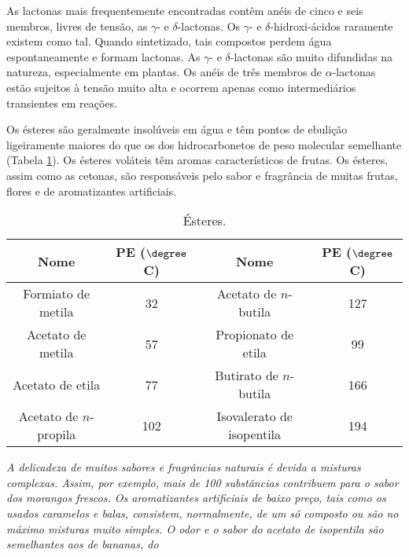 \noindent As lactonas mais frequentemente encontradas contêm anéis de cinco e seis membros, livres de tensão, as $\gamma$- e $\delta$-lactonas. Os $\gamma$- e $\delta$-hidroxi-ácidos raramente existem como tal. Quando sintetizado, tais compostos perdem água espontaneamente e formam lactonas. As $\gamma$- e $\delta$-lactonas são muito difundidas na natureza, especialmente em plantas. Os anéis de três membros de $\alpha$-lactonas estão sujeitos à tensão muito alta e ocorrem apenas como intermediários transientes em reações.

\begin{tightcenter}
    \chemnameinit{}
    \qquad\qquad
    \qquad\qquad
\end{tightcenter}

Os ésteres são geralmente insolúveis em água e têm pontos de ebulição ligeiramente maiores do que os dos hidrocarbonetos de peso molecular semelhante (Tabela \ref{tab8_3}). Os ésteres voláteis têm aromas característicos de frutas. Os ésteres, assim como as cetonas, são responsáveis pelo sabor e fragrância de muitas frutas, flores e de aromatizantes artificiais.

\begin{table}[H]
    \centering
    \caption{Ésteres.}
    \label{tab8_3}
    \begin{tabular}{cccc}
        \toprule
        Nome & PE ($\degree$C) & Nome & PE ($\degree$C)  \\
        \midrule
        Formiato de metila & 32 & Acetato de $n$-butila & 127 \\
        Acetato de metila & 57 & Propionato de etila & 99 \\
        Acetato de etila & 77 & Butirato de $n$-butila & 166 \\
        Acetato de $n$-propila & 102 & Isovalerato de isopentila & 194 \\
        \bottomrule
    \end{tabular}
\end{table}

\par\bigskip
\noindent\emph{A delicadeza de muitos sabores e fragrâncias naturais é devida a misturas complexas. Assim, por exemplo, mais de 100 substâncias contribuem para o sabor dos morangos frescos. Os aromatizantes artificiais de baixo preço, tais como os usados caramelos e balas, consistem, normalmente, de um só composto ou são no máximo misturas muito simples. O odor e o sabor do acetato de isopentila são semelhantes aos de bananas, do} 
